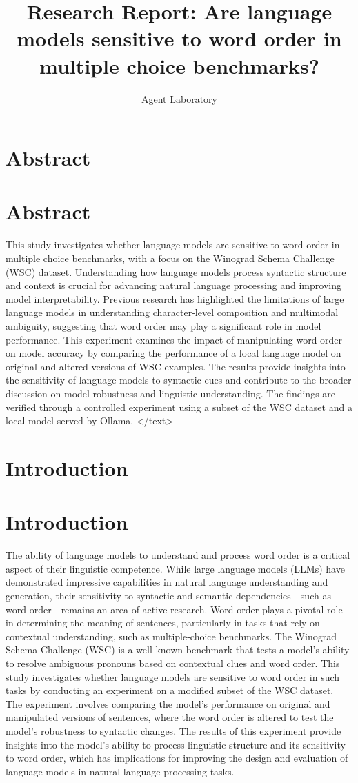 \documentclass{article}
\title{Research Report: Are language models sensitive to word order in multiple choice benchmarks?}
\author{Agent Laboratory}
\begin{document}
\maketitle
\section{Abstract}
\section*{Abstract}
This study investigates whether language models are sensitive to word order in multiple choice benchmarks, with a focus on the Winograd Schema Challenge (WSC) dataset. Understanding how language models process syntactic structure and context is crucial for advancing natural language processing and improving model interpretability. Previous research has highlighted the limitations of large language models in understanding character-level composition and multimodal ambiguity, suggesting that word order may play a significant role in model performance. This experiment examines the impact of manipulating word order on model accuracy by comparing the performance of a local language model on original and altered versions of WSC examples. The results provide insights into the sensitivity of language models to syntactic cues and contribute to the broader discussion on model robustness and linguistic understanding. The findings are verified through a controlled experiment using a subset of the WSC dataset and a local model served by Ollama.
</text>
\section{Introduction}
\section{Introduction}
The ability of language models to understand and process word order is a critical aspect of their linguistic competence. While large language models (LLMs) have demonstrated impressive capabilities in natural language understanding and generation, their sensitivity to syntactic and semantic dependencies—such as word order—remains an area of active research. Word order plays a pivotal role in determining the meaning of sentences, particularly in tasks that rely on contextual understanding, such as multiple-choice benchmarks. The Winograd Schema Challenge (WSC) is a well-known benchmark that tests a model's ability to resolve ambiguous pronouns based on contextual clues and word order. This study investigates whether language models are sensitive to word order in such tasks by conducting an experiment on a modified subset of the WSC dataset. The experiment involves comparing the model's performance on original and manipulated versions of sentences, where the word order is altered to test the model's robustness to syntactic changes. The results of this experiment provide insights into the model's ability to process linguistic structure and its sensitivity to word order, which has implications for improving the design and evaluation of language models in natural language processing tasks.
\end{document}
